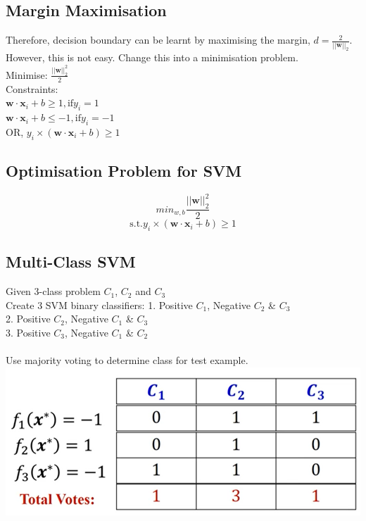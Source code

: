 \subsection*{Margin Maximisation}
Therefore, decision boundary can be learnt by maximising the margin, $d=\frac{2}{||\mathbf{w}||_2}$. However, this is not easy.
Change this into a minimisation problem.\\
Minimise: $\frac{||\mathbf{w}||_2^2}{2}$\\
Constraints:\\
$\mathbf{w}\cdot\mathbf{x}_i + b \geq 1, \text{if} y_i = 1$\\
$\mathbf{w}\cdot\mathbf{x}_i + b \leq -1, \text{if} y_i = -1$\\
OR, $y_i \times (\mathbf{w}\cdot\mathbf{x}_i + b) \geq 1$
\subsection*{Optimisation Problem for SVM}
\[min_{w,b} \frac{||\mathbf{w}||_2^2}{2}\]
\[\text{s.t.} y_i \times (\mathbf{w}\cdot\mathbf{x}_i + b) \geq 1\]
\subsection*{Multi-Class SVM}
Given 3-class problem $C_1$, $C_2$ and $C_3$\\
Create 3 SVM binary classifiers:
1. Positive $C_1$, Negative $C_2$ \& $C_3$\\
2. Positive $C_2$, Negative $C_1$ \& $C_3$\\
3. Positive $C_3$, Negative $C_1$ \& $C_2$\\\\
Use majority voting to determine class for test example.
\includegraphics[width=\linewidth]{fig/multiclasssvm.PNG}

